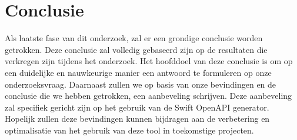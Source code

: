 \section{Conclusie}
Als laatste fase van dit onderzoek, zal er een grondige conclusie worden getrokken. Deze conclusie zal volledig gebaseerd zijn op de resultaten die verkregen zijn tijdens het onderzoek. Het hoofddoel van deze conclusie is om op een duidelijke en nauwkeurige manier een antwoord te formuleren op onze onderzoeksvraag. Daarnaast zullen we op basis van onze bevindingen en de conclusie die we hebben getrokken, een aanbeveling schrijven. Deze aanbeveling zal specifiek gericht zijn op het gebruik van de Swift OpenAPI generator. Hopelijk zullen deze bevindingen kunnen bijdragen aan
de verbetering en optimalisatie van het gebruik van deze tool in toekomstige projecten.


